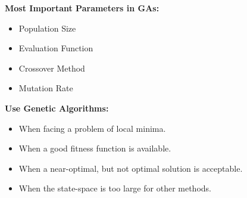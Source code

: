  \textbf{Most Important Parameters in GAs:}
 \begin{itemize}
 	\item Population Size
 	\item Evaluation Function
 	\item Crossover Method
 	\item Mutation Rate
 \end{itemize}

\textbf{Use Genetic Algorithms:} 
\begin{itemize}
	\item When facing a problem of local minima.
	\item When a good fitness function is available.
	\item When a near-optimal, but not optimal solution is acceptable.
	\item When the state-space is too large for other methods.
\end{itemize}

